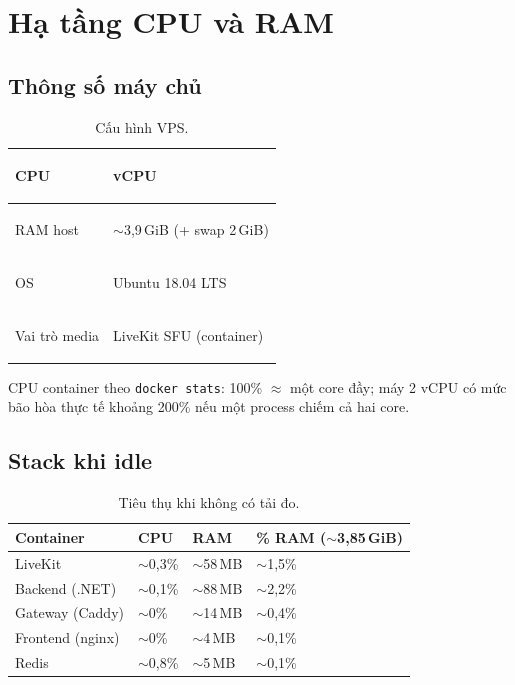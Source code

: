 \section{Hạ tầng CPU và RAM}

\subsection{Thông số máy chủ}

\begin{table}[htbp]
\centering
\small
\begin{tabularx}{\textwidth}{|>{\bfseries\raggedright\arraybackslash}p{}|>{\raggedright\arraybackslash}X|}
\hline
CPU & 2 vCPU \\
\hline
RAM host & $\sim$3{,}9\,GiB (+ swap 2\,GiB) \\
\hline
OS & Ubuntu 18.04 LTS \\
\hline
Vai trò media & LiveKit SFU (container) \\
\hline
\end{tabularx}
\caption{Cấu hình VPS.}
\label{tab:vps-spec}
\end{table}

\noindent
CPU container theo \texttt{docker stats}: 100\% $\approx$ một core đầy; máy 2 vCPU có
mức bão hòa thực tế khoảng 200\% nếu một process chiếm cả hai core.

\subsection{Stack khi idle}

\begin{table}[htbp]
\centering
\small
\begin{tabularx}{\textwidth}{|>{\raggedright\arraybackslash}p{}|>{\raggedleft\arraybackslash}p{}|>{\raggedleft\arraybackslash}p{}|>{\raggedleft\arraybackslash}X|}
\hline
\bfseries Container & \bfseries CPU & \bfseries RAM & \bfseries \% RAM ($\sim$3{,}85\,GiB) \\
\hline
LiveKit & $\sim$0{,}3\% & $\sim$58\,MB & $\sim$1{,}5\% \\
\hline
Backend (.NET) & $\sim$0{,}1\% & $\sim$88\,MB & $\sim$2{,}2\% \\
\hline
Gateway (Caddy) & $\sim$0\% & $\sim$14\,MB & $\sim$0{,}4\% \\
\hline
Frontend (nginx) & $\sim$0\% & $\sim$4\,MB & $\sim$0{,}1\% \\
\hline
Redis & $\sim$0{,}8\% & $\sim$5\,MB & $\sim$0{,}1\% \\
\hline
\end{tabularx}
\caption{Tiêu thụ khi không có tải đo.}
\label{tab:idle-stack}
\end{table}

